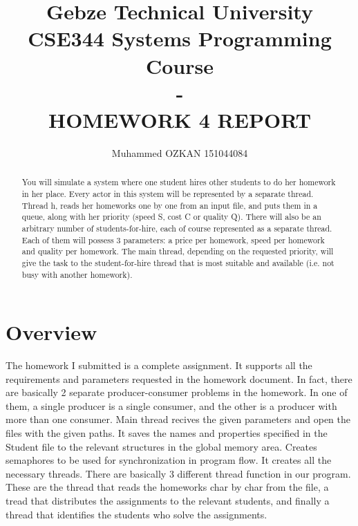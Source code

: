 \documentclass{article}
\begin{document}
\title{Gebze Technical University\\CSE344 Systems Programming Course\\ -\\HOMEWORK 4 REPORT}
\author{Muhammed OZKAN 151044084}

\maketitle

\begin{abstract}
You will simulate a system where one student hires other students to do her homework in her place. 
Every actor in this system will be represented by a separate thread. Thread h, reads her homeworks 
one by one from an input file, and puts them in a queue, along with her priority (speed S, cost C or 
quality Q). There will also be an arbitrary number of students-for-hire, each of course represented as 
a separate thread. Each of them will possess 3 parameters: a price per homework, speed per 
homework and quality per homework. The main thread, depending on the requested priority, will 
give the task to the student-for-hire thread that is most suitable and available (i.e. not busy with 
another homework). 
\end{abstract}

\section{Overview}
\quad The homework I submitted is a complete assignment. It supports all the requirements and parameters requested in the homework document. In fact, there are basically 2 separate producer-consumer problems in the homework. In one of them, a single producer is a single consumer, and the other is a producer with more than one consumer. Main thread recives the given parameters and open the files with the given paths. It saves the names and properties specified in the Student file to the relevant structures in the global memory area. Creates semaphores to be used for synchronization in program flow. It creates all the necessary threads. There are basically 3 different thread function in our program. These are the thread that reads the homeworks char by char from the file, a tread that distributes the assignments to the relevant students, and finally a thread that identifies the students who solve the assignments. \\
\newpage
\end{document}
